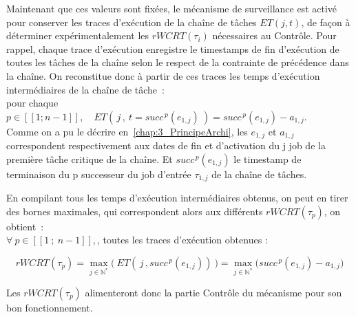 \documentclass[french, a4paper, 11pt, twoside, pdftex]{StyleThese}
\begin{document}
    		Maintenant que ces valeurs sont fixées, le mécanisme de surveillance est activé pour conserver les traces d'exécution de la chaîne de tâches $ET(j,t)$, de façon à déterminer expérimentalement les $rWCRT(\tau_i)$ nécessaires au Contrôle.
    		Pour rappel, chaque trace d'exécution enregistre le timestamps de fin d'exécution de toutes les tâches de la chaîne selon le respect de la contrainte de précédence dans la chaîne. On reconstitue donc à partir de ces traces les temps d'exécution intermédiaires de la chaîne de tâche~: \\
    		pour chaque $p \in [\![1;n-1]\!], \quad ET(\,j\,,~t=succ^{\,p}(e_{1,j})~) = succ^{\,p}(e_{1,j}) - a_{1,j}$. \\
    		Comme on a pu le décrire en~\autoref{chap:3_PrincipeArchi}, les $e_{1,j}$ et $a_{1,j}$ correspondent respectivement aux dates de fin et d'activation du j job de la première tâche critique de la chaîne. Et $succ^{\,p}(e_{1,j})$ le timestamp de terminaison du p successeur du job d'entrée $\tau_{1,j}$ de la chaîne de tâches.
    		
    		En compilant tous les temps d'exécution intermédiaires obtenus, on peut en tirer des bornes maximales, qui correspondent alors aux différents $ rWCRT(\tau_p) $, on obtient~: \\
    		$\forall \ p \in [\![1\ ;\ n-1]\!], $, toutes les traces d'exécution obtenues :
    		
    		\begin{equation}
    			rWCRT(\tau_p) = \max_{j \in \mathbb{N^*}}\Big(~ET(\,j\,, succ^{\,p}(e_{1,j}) )~\Big) = \max_{j \in \mathbb{N^*}}\Big( succ^{\,p}(e_{1,j}) - a_{1,j} \Big) 
    		\end{equation} 
    	
    		Les $rWCRT(\tau_p)$ alimenteront donc la partie Contrôle du mécanisme pour son bon fonctionnement.
                    
\end{document}
